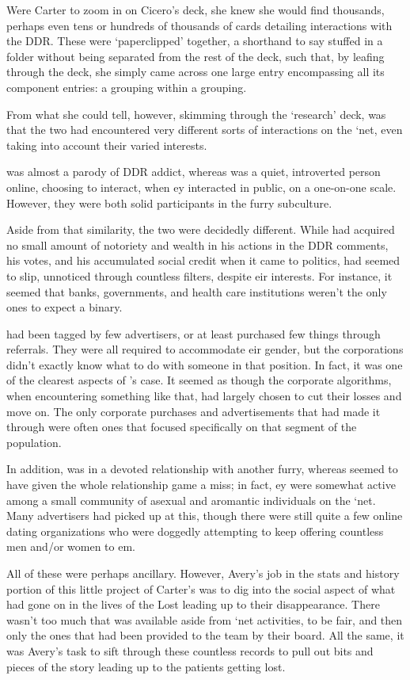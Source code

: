 Were Carter to zoom in on Cicero's deck, she knew she would find thousands, perhaps even tens or hundreds of thousands of cards detailing interactions with the DDR.  These were `paperclipped' together, a shorthand to say stuffed in a folder without being separated from the rest of the deck, such that, by leafing through the deck, she simply came across one large entry encompassing all its component entries: a grouping within a grouping.

From what she could tell, however, skimming through the `research' deck, was that the two had encountered very different sorts of interactions on the `net, even taking into account their varied interests.

\ptCollin was almost a parody of DDR addict, whereas \ptRJ was a quiet, introverted person online, choosing to interact, when ey interacted in public, on a one-on-one scale.  However, they were both solid participants in the furry subculture.

Aside from that similarity, the two were decidedly different.  While \ptCollin had acquired no small amount of notoriety and wealth in his actions in the DDR comments, his votes, and his accumulated social credit when it came to politics, \ptRJ had seemed to slip, unnoticed through countless filters, despite eir interests.  For instance, it seemed that banks, governments, and health care institutions weren't the only ones to expect a binary.

\ptRJ had been tagged by few advertisers, or at least purchased few things through referrals.  They were all required to accommodate eir gender, but the corporations didn't exactly know what to do with someone in that position.  In fact, it was one of the clearest aspects of \ptRJ's case.  It seemed as though the corporate algorithms, when encountering something like that, had largely chosen to cut their losses and move on.  The only corporate purchases and advertisements that had made it through were often ones that focused specifically on that segment of the population.

In addition, \ptCollin was in a devoted relationship with another furry, whereas \ptRJ seemed to have given the whole relationship game a miss; in fact, ey were somewhat active among a small community of asexual and aromantic individuals on the `net.  Many advertisers had picked up at this, though there were still quite a few online dating organizations who were doggedly attempting to keep offering countless men and/or women to em.

All of these were perhaps ancillary.  However, Avery's job in the stats and history portion of this little project of Carter's was to dig into the social aspect of what had gone on in the lives of the Lost leading up to their disappearance.  There wasn't too much that was available aside from `net activities, to be fair, and then only the ones that had been provided to the team by their board.  All the same, it was Avery's task to sift through these countless records to pull out bits and pieces of the story leading up to the patients getting lost.


